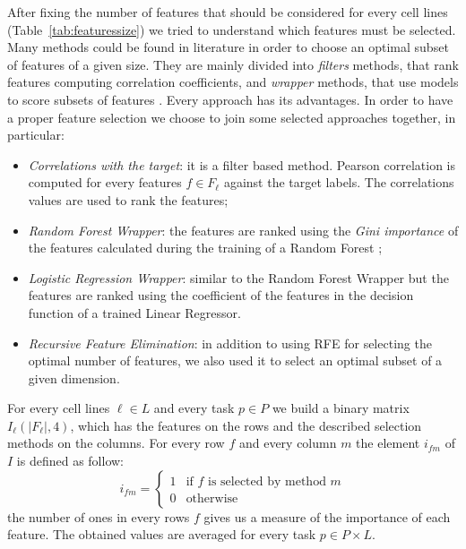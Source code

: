 After fixing the number of features that should be considered for every cell lines (Table~\ref{tab:featuressize}) we tried to understand which features must be selected. Many methods could be found in literature in order to choose an optimal subset of features of a given size. They are mainly divided into \emph{filters} methods, that rank features computing correlation coefficients, and \emph{wrapper} methods, that use models to score subsets of features \cite{Guyon}. Every approach has its advantages. In order to have a proper feature selection we choose to join some selected approaches together, in particular:
\begin{itemize}
    \item \textit{Correlations with the target}: it is a filter based method. Pearson correlation is computed for every features $f \in F_\ell$ against the target labels. The correlations values are used to rank the features;
    \item \textit{Random Forest Wrapper}: the features are ranked using the \emph{Gini importance} \cite{giniimportance} of the features calculated during the training of a Random Forest \cite{breiman2001random}; 
    \item \textit{Logistic Regression Wrapper}: similar to the Random Forest Wrapper but the features are ranked using the coefficient of the features in the decision function of a trained Linear Regressor.
    \item \emph{Recursive Feature Elimination}: in addition to using RFE for selecting the optimal number of features, we also used it to select an optimal subset of a given dimension. 
\end{itemize}
For every cell lines $\ell \in L$ and every task $p \in P$ we build a binary matrix $I_\ell(|F_\ell|, 4)$, which has the features on the rows and the described selection methods on the columns. For every row $f$ and every column $m$ the element $i_{fm}$ of $I$ is defined as follow: 
\[
    i_{fm} = \begin{cases} 1 & \mbox{if } f \mbox{ is selected by method } m \\ 0 & \mbox{otherwise} \end{cases}
\]
the number of ones in every rows $f$ gives us a measure of the importance of each feature. The obtained values are averaged for every task $p \in P \times L$. 

